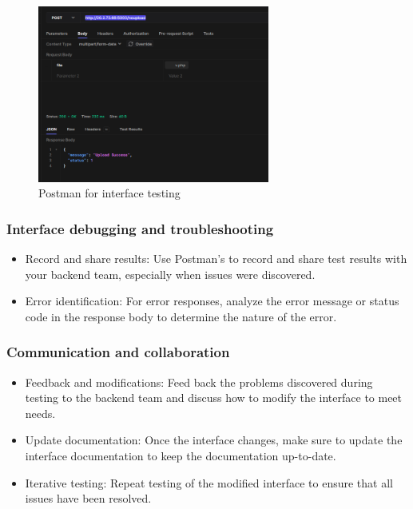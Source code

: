 \documentclass[journal]{IEEEtran}
\begin{document}
\begin{figure}[!t]
  \centering
  \includegraphics[width=3in]{figures/solution-postman.png}
  \caption{Postman for interface testing}
  \label{fig:postman}
  \end{figure}

\subsubsection{Interface debugging and troubleshooting}
\begin{itemize}
  \item Record and share results: Use Postman's to record and share test results with your backend team, especially when issues were discovered.
  \item Error identification: For error responses, analyze the error message or status code in the response body to determine the nature of the error.
\end{itemize}
\subsubsection{Communication and collaboration}
\begin{itemize}
  \item Feedback and modifications: Feed back the problems discovered during testing to the backend team and discuss how to modify the interface to meet needs.
  \item Update documentation: Once the interface changes, make sure to update the interface documentation to keep the documentation up-to-date.
  \item Iterative testing: Repeat testing of the modified interface to ensure that all issues have been resolved.
\end{itemize}
\end{document}
